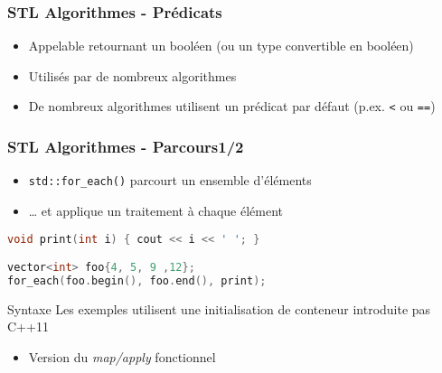 \documentclass[C++.tex]{subfiles}
\begin{document}
\begin{frame}
	\frametitle{STL Algorithmes - Prédicats}
	\begin{itemize}
		\item \og Appelable\fg{} retournant un booléen (ou un type convertible en booléen)


		\item Utilisés par de nombreux algorithmes
		\item De nombreux algorithmes utilisent un prédicat par défaut (p.ex. \lstinline|<| ou \lstinline|==|)


	\end{itemize}
\end{frame}

\begin{frame}[fragile]
	\frametitle{STL Algorithmes - Parcours\titlehfill{}1/2}
	\begin{itemize}
		\item \lstinline|std::for_each()| parcourt un ensemble d'éléments
		\item \ldots{} et applique un traitement à chaque élément
	\end{itemize}

	\begin{lstlisting}[language=C++]
void print(int i) { cout << i << ' '; }

vector<int> foo{4, 5, 9 ,12};
for_each(foo.begin(), foo.end(), print);\end{lstlisting}

	\begin{alertblock}{Syntaxe}
		Les exemples utilisent une initialisation de conteneur introduite pas C++11
	\end{alertblock}

	\begin{itemize}
		\item Version du \textit{map/apply} fonctionnel
	\end{itemize}
\end{frame}
\end{document}
